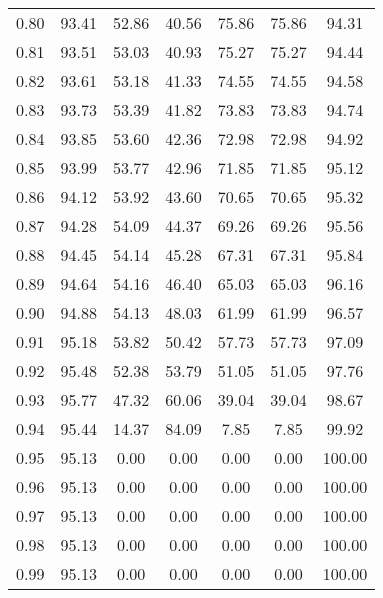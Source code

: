 \begin{tabular}{|c|c|c|c|c|c|c|}
      0.80 &     93.41 &     52.86 &      40.56 &   75.86 &      75.86 &         94.31 \\
      0.81 &     93.51 &     53.03 &      40.93 &   75.27 &      75.27 &         94.44 \\
      0.82 &     93.61 &     53.18 &      41.33 &   74.55 &      74.55 &         94.58 \\
      0.83 &     93.73 &     53.39 &      41.82 &   73.83 &      73.83 &         94.74 \\
      0.84 &     93.85 &     53.60 &      42.36 &   72.98 &      72.98 &         94.92 \\
      0.85 &     93.99 &     53.77 &      42.96 &   71.85 &      71.85 &         95.12 \\
      0.86 &     94.12 &     53.92 &      43.60 &   70.65 &      70.65 &         95.32 \\
      0.87 &     94.28 &     54.09 &      44.37 &   69.26 &      69.26 &         95.56 \\
      0.88 &     94.45 &     54.14 &      45.28 &   67.31 &      67.31 &         95.84 \\
      0.89 &     94.64 &     54.16 &      46.40 &   65.03 &      65.03 &         96.16 \\
      0.90 &     94.88 &     54.13 &      48.03 &   61.99 &      61.99 &         96.57 \\
      0.91 &     95.18 &     53.82 &      50.42 &   57.73 &      57.73 &         97.09 \\
      0.92 &     95.48 &     52.38 &      53.79 &   51.05 &      51.05 &         97.76 \\
      0.93 &     95.77 &     47.32 &      60.06 &   39.04 &      39.04 &         98.67 \\
      0.94 &     95.44 &     14.37 &      84.09 &    7.85 &       7.85 &         99.92 \\
      0.95 &     95.13 &      0.00 &       0.00 &    0.00 &       0.00 &        100.00 \\
      0.96 &     95.13 &      0.00 &       0.00 &    0.00 &       0.00 &        100.00 \\
      0.97 &     95.13 &      0.00 &       0.00 &    0.00 &       0.00 &        100.00 \\
      0.98 &     95.13 &      0.00 &       0.00 &    0.00 &       0.00 &        100.00 \\
      0.99 &     95.13 &      0.00 &       0.00 &    0.00 &       0.00 &        100.00 \\
\bottomrule
\end{tabular}
